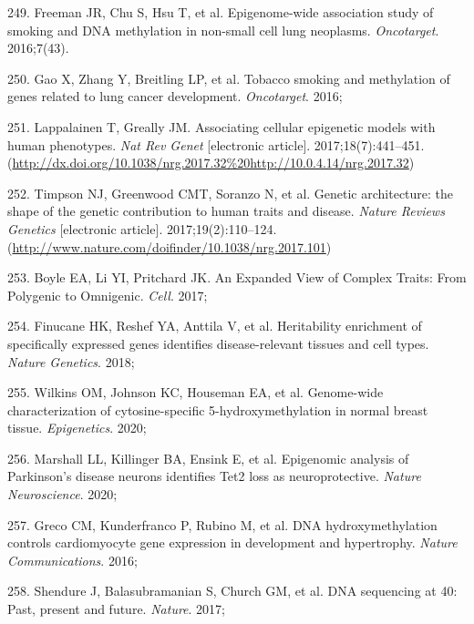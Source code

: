 \documentclass[11pt,twoside]{bristolthesis}
\newenvironment{cslreferences}%
  {}%
  {\par}
\begin{document}
\begin{cslreferences}
\leavevmode\hypertarget{ref-Freeman2016}{}%
249. Freeman JR, Chu S, Hsu T, et al. Epigenome-wide association study of smoking and DNA methylation in non-small cell lung neoplasms. \emph{Oncotarget}. 2016;7(43).

\leavevmode\hypertarget{ref-Gao2016}{}%
250. Gao X, Zhang Y, Breitling LP, et al. Tobacco smoking and methylation of genes related to lung cancer development. \emph{Oncotarget}. 2016;

\leavevmode\hypertarget{ref-Lappalainen2017}{}%
251. Lappalainen T, Greally JM. Associating cellular epigenetic models with human phenotypes. \emph{Nat Rev Genet} {[}electronic article{]}. 2017;18(7):441--451. (\url{http://dx.doi.org/10.1038/nrg.2017.32\%20http://10.0.4.14/nrg.2017.32})

\leavevmode\hypertarget{ref-Timpson2017}{}%
252. Timpson NJ, Greenwood CMT, Soranzo N, et al. Genetic architecture: the shape of the genetic contribution to human traits and disease. \emph{Nature Reviews Genetics} {[}electronic article{]}. 2017;19(2):110--124. (\url{http://www.nature.com/doifinder/10.1038/nrg.2017.101})

\leavevmode\hypertarget{ref-Boyle2017}{}%
253. Boyle EA, Li YI, Pritchard JK. An Expanded View of Complex Traits: From Polygenic to Omnigenic. \emph{Cell}. 2017;

\leavevmode\hypertarget{ref-Finucane2018}{}%
254. Finucane HK, Reshef YA, Anttila V, et al. Heritability enrichment of specifically expressed genes identifies disease-relevant tissues and cell types. \emph{Nature Genetics}. 2018;

\leavevmode\hypertarget{ref-Wilkins2020}{}%
255. Wilkins OM, Johnson KC, Houseman EA, et al. Genome-wide characterization of cytosine-specific 5-hydroxymethylation in normal breast tissue. \emph{Epigenetics}. 2020;

\leavevmode\hypertarget{ref-Marshall2020}{}%
256. Marshall LL, Killinger BA, Ensink E, et al. Epigenomic analysis of Parkinson's disease neurons identifies Tet2 loss as neuroprotective. \emph{Nature Neuroscience}. 2020;

\leavevmode\hypertarget{ref-Greco2016}{}%
257. Greco CM, Kunderfranco P, Rubino M, et al. DNA hydroxymethylation controls cardiomyocyte gene expression in development and hypertrophy. \emph{Nature Communications}. 2016;

\leavevmode\hypertarget{ref-Shendure2017}{}%
258. Shendure J, Balasubramanian S, Church GM, et al. DNA sequencing at 40: Past, present and future. \emph{Nature}. 2017;


\end{cslreferences}
\end{document}
